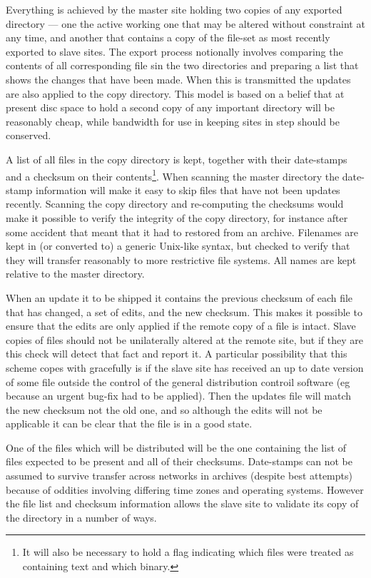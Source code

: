 Everything is achieved by the master site holding two copies of any
exported directory --- one the active working one that may be altered
without constraint at any time, and another that contains a copy of
the file-set as most recently exported to slave sites.  The export
process notionally involves comparing the contents of all corresponding
file sin the two directories and preparing a list that shows the
changes that have been made. When this is transmitted the updates
are also applied to the copy directory.  This model is based on a belief
that at present disc space to hold a second copy of any important
directory will be reasonably cheap, while bandwidth for use in keeping
sites in step should be conserved.

A list of all files in the copy directory is kept, together with
their date-stamps and a checksum on their contents\footnote{It will
also be necessary to hold a flag indicating which files were
treated as containing text and which binary.}. When scanning the
master directory the date-stamp information will make it easy to
skip files that have not been updates recently. Scanning the copy directory
and re-computing the checksums would make it possible to verify the
integrity of the copy directory, for instance after some accident that
meant that it had to restored from an archive. Filenames are kept in
(or converted to) a generic Unix-like syntax, but checked to verify that
they will transfer reasonably to more restrictive file systems. All
names are kept relative to the master directory.

When an update it to be shipped it contains the previous checksum of
each file that has changed, a set of edits, and the new checksum. This
makes it possible to ensure that the edits are only applied if the
remote copy of a file is intact. Slave copies of files should not be
unilaterally altered at the remote site, but if they are this check will
detect that fact and report it.  A particular possibility that this
scheme copes with gracefully is if the slave site has received an up
to date version of some file outside the control of the general
distribution controil software (eg because an urgent bug-fix had to
be applied). Then the updates file will match the new checksum not the old
one, and so although the edits will not be applicable it can be
clear that the file is in a good state.

One of the files which will be distributed will be the one containing the
list of files expected to be present and all of their checksums.
Date-stamps can not be assumed to survive transfer across networks in
archives (despite best attempts) because of oddities involving differing
time zones and operating systems. However the file list and checksum
information allows the slave site to validate its copy of the directory
in a number of ways.

